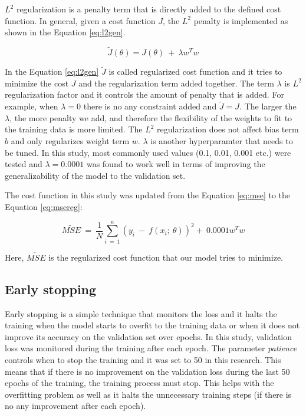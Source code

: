 \documentclass[a4paper, twoside]{templates/ociamthesis}
\begin{document}
\(L^{2}\) regularization is a penalty term that is directly added to the defined cost function. In general, given a cost function \(J\), the \(L^{2}\) penalty is implemented as shown in the Equation \eqref{eq:l2gen}.

\begin{equation}
\tilde{J}(\theta) = J\left(\theta\right)\ +\ \lambda w^Tw
\label{eq:l2gen}
\end{equation}

In the Equation \eqref{eq:l2gen} \(\tilde{J}\) is called regularized cost function and it tries to minimize the cost \(J\) and the regularization term added together. The term \(\lambda\) is \(L^{2}\) regularization factor and it controls the amount of penalty that is added. For example, when \(\lambda = 0\) there is no any constraint added and \(\tilde{J} = J\). The larger the \(\lambda\), the more penalty we add, and therefore the flexibility of the weights to fit to the training data is more limited. The \(L^{2}\) regularization does not affect bias term \(b\) and only regularizes weight term \(w\). \(\lambda\) is another hyperparamter that needs to be tuned. In this study, most commonly used values (0.1, 0.01, 0.001 etc.) were tested and \(\lambda = 0.0001\) was found to work well in terms of improving the generalizability of the model to the validation set.

The cost function in this study was updated from the Equation \eqref{eq:mse} to the Equation \eqref{eq:msereg}:

\begin{equation}
\tilde{MSE}\ =\ \frac{1}{N}\sum_{i\ =\ 1}^n\left(y_i\ -\ f\left(x_i;\ \theta\right)\right)^2 +\ 0.0001 w^Tw
\label{eq:msereg}
\end{equation}

Here, \(\tilde{MSE}\) is the regularized cost function that our model tries to minimize.

\hypertarget{early-stopping}{%
\subsection{Early stopping}\label{early-stopping}}

Early stopping is a simple technique that monitors the loss and it halts the training when the model starts to overfit to the training data or when it does not improve its accuracy on the validation set over epochs. In this study, validation loss was monitored during the training after each epoch. The parameter \emph{patience} controls when to stop the training and it was set to 50 in this research. This means that if there is no improvement on the validation loss during the last 50 epochs of the training, the training process must stop. This helps with the overfitting problem as well as it halts the unnecessary training steps (if there is no any improvement after each epoch).
\end{document}
